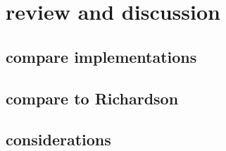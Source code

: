 
\graphicspath{{./sections/appendix/assets}}

\chapter{review and discussion}

\section{compare implementations}
\section{compare to Richardson}
\section{considerations}